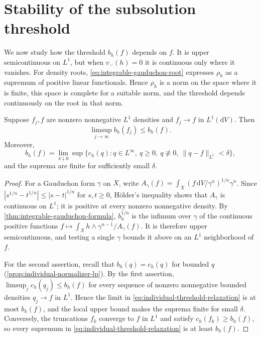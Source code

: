 \section{Stability of the subsolution threshold}
\label{sec:individual-density-stability}

We now study how the threshold $b_h(f)$ depends on $f$. It is upper semicontinuous on $L^1$, but when $v_-(h)=0$ it is continuous only where it vanishes. For density roots, \eqref{eq:integrable-gauduchon-root} expresses $\rho_h$ as a supremum of positive linear functionals. Hence $\rho_h$ is a norm on the space where it is finite, this space is complete for a suitable norm, and the threshold depends continuously on the root in that norm.

\begin{theorem}\label{thm:individual-threshold-semicontinuity}
Suppose $f_j,f$ are nonzero nonnegative $L^1$ densities and $f_j\to f$ in $L^1(\mathrm{d}V)$. Then
\[
 \limsup_{j\to\infty}b_h(f_j)\leq b_h(f).
\]
Moreover,
\begin{equation}\label{eq:individual-threshold-relaxation}
 b_h(f)=\lim_{\delta\downarrow0}\sup\{c_h(q):q\in L^\infty,\ q\geq0,\ q\not\equiv0,
                                      \ \|q-f\|_{L^1}<\delta\},
\end{equation}
and the suprema are finite for sufficiently small $\delta$.
\end{theorem}
\begin{proof}
For a Gauduchon form $\gamma$ on $X$, write $A_\gamma(f)=\int_X(f\,\mathrm{d}V/\gamma^n)^{1/n}\gamma^n$. Since $|s^{1/n}-t^{1/n}|\leq|s-t|^{1/n}$ for $s,t\geq0$, H\"older's inequality shows that $A_\gamma$ is continuous on $L^1$; it is positive at every nonzero nonnegative density. By \cref{thm:integrable-gauduchon-formula}, $b_h^{1/n}$ is the infimum over $\gamma$ of the continuous positive functions $f\mapsto\int_Xh\wedge\gamma^{n-1}/A_\gamma(f)$. It is therefore upper semicontinuous, and testing a single $\gamma$ bounds it above on an $L^1$ neighborhood of $f$.

For the second assertion, recall that $b_h(q)=c_h(q)$ for bounded $q$ (\cref{prop:individual-normalizer-lp}). By the first assertion, $\limsup_jc_h(q_j)\leq b_h(f)$ for every sequence of nonzero nonnegative bounded densities $q_j\to f$ in $L^1$. Hence the limit in \eqref{eq:individual-threshold-relaxation} is at most $b_h(f)$, and the local upper bound makes the suprema finite for small $\delta$. Conversely, the truncations $f_k$ converge to $f$ in $L^1$ and satisfy $c_h(f_k)\geq b_h(f)$, so every supremum in \eqref{eq:individual-threshold-relaxation} is at least $b_h(f)$.
\end{proof}

